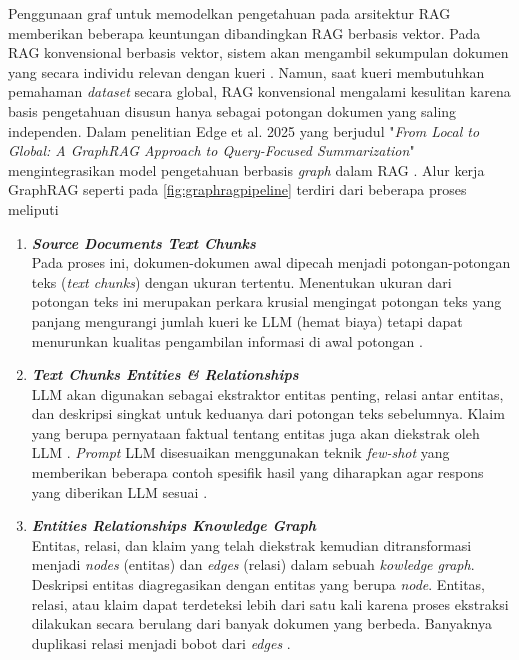 Penggunaan graf untuk memodelkan pengetahuan pada arsitektur RAG memberikan beberapa keuntungan dibandingkan RAG berbasis vektor.
Pada RAG konvensional berbasis vektor, sistem akan mengambil sekumpulan dokumen yang secara individu relevan dengan kueri \cite{Lewis2021RAGKnowledgeIntensiveNLP}.
Namun, saat kueri membutuhkan pemahaman \textit{dataset} secara global, RAG konvensional mengalami kesulitan karena basis pengetahuan disusun hanya sebagai potongan dokumen yang saling independen.
Dalam penelitian Edge et al. 2025 yang berjudul "\textit{From Local to Global: A GraphRAG Approach to Query-Focused Summarization}" mengintegrasikan model pengetahuan berbasis \textit{graph} dalam RAG \cite{Edge2025LocalGlobalGraphRAG}.
Alur kerja GraphRAG seperti pada \ref{fig:graphragpipeline} terdiri dari beberapa proses meliputi
\begin{enumerate}
	\item \textbf{\textit{Source Documents \textrightarrow{} Text Chunks}} \\
	      Pada proses ini, dokumen-dokumen awal dipecah menjadi potongan-potongan teks (\textit{text chunks}) dengan ukuran tertentu.
	      Menentukan ukuran dari potongan teks ini merupakan perkara krusial mengingat potongan teks yang panjang mengurangi jumlah kueri ke LLM (hemat biaya) tetapi dapat menurunkan kualitas pengambilan informasi di awal potongan \cite{Edge2025LocalGlobalGraphRAG}.

	\item \textbf{\textit{Text Chunks \textrightarrow{} Entities \& Relationships}} \\
	      LLM akan digunakan sebagai ekstraktor entitas penting, relasi antar entitas, dan deskripsi singkat untuk keduanya dari potongan teks sebelumnya.
	      Klaim yang berupa pernyataan faktual tentang entitas juga akan diekstrak oleh LLM \cite{Edge2025LocalGlobalGraphRAG}.
	      \textit{Prompt} LLM disesuaikan menggunakan teknik \textit{few-shot} yang memberikan beberapa contoh spesifik hasil yang diharapkan agar respons yang diberikan LLM sesuai \cite{LLMisFewShot2020}.

	\item \textbf{\textit{Entities Relationships \textrightarrow{} Knowledge Graph}} \\
	      Entitas, relasi, dan klaim yang telah diekstrak kemudian ditransformasi menjadi \textit{nodes} (entitas) dan \textit{edges} (relasi) dalam sebuah \textit{kowledge graph}.
	      Deskripsi entitas diagregasikan dengan entitas yang berupa \textit{node}.
	      Entitas, relasi, atau klaim dapat terdeteksi lebih dari satu kali karena proses ekstraksi dilakukan secara berulang dari banyak dokumen yang berbeda.
	      Banyaknya duplikasi relasi menjadi bobot dari \textit{edges} \cite{Edge2025LocalGlobalGraphRAG}.


\end{enumerate}
